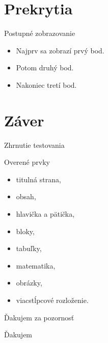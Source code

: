 \documentclass[aspectratio=169]{beamer}
\begin{document}
	\section{Prekrytia}
	
	\begin{frame}{Postupné zobrazovanie}
		\begin{itemize}
			\item<1-> Najprv sa zobrazí prvý bod.
			\item<2-> Potom druhý bod.
			\item<3-> Nakoniec tretí bod.
		\end{itemize}
		
	\end{frame}
	
	\section{Záver}
	
	\begin{frame}{Zhrnutie testovania}
		\begin{block}{Overené prvky}
			\begin{itemize}
				\item titulná strana,
				\item obsah,
				\item hlavička a pätička,
				\item bloky,
				\item tabuľky,
				\item matematika,
				\item obrázky,
				\item viacstĺpcové rozloženie.
			\end{itemize}
		\end{block}
	\end{frame}
	
	\begin{frame}{Ďakujem za pozornosť}
		\begin{center}
			{\Huge Ďakujem}
			
			\vspace{0.8cm}
			
			\UTBLogoLarge
		\end{center}
	\end{frame}
	
\end{document}
